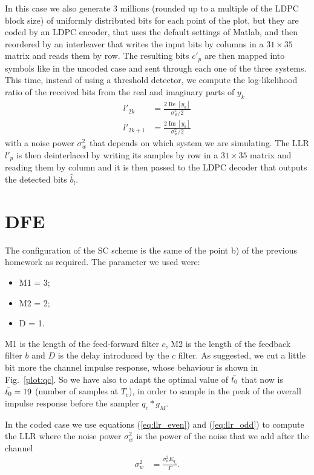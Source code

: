 \documentclass[a4paper,oneside]{article}
\renewcommand{\Re}[1]{\operatorname{Re}\left[#1\right]}
\renewcommand{\Im}[1]{\operatorname{Im}\left[#1\right]}
\begin{document}
In this case we also generate 3 millions (rounded up to a multiple of
the LDPC block size) of uniformly distributed bits for each point of
the plot, but they are coded by an LDPC encoder, that uses the default
settings of Matlab, and then reordered by an interleaver that writes
the input bits by columns in a $31\times35$ matrix and reads them by
row. The resulting bits $c'_p$ are then mapped into symbols like in
the uncoded case and sent through each one of the three systems.  This
time, instead of using a threshold detector, we compute the
log-likelihood ratio of the received bits from the real and imaginary
parts of $y_k$
\begin{align}
  l'_{2k} &= \frac{2\Re{y_k}}{\sigma^2_w/2}
  \label{eq:llr_even} \\
  l'_{2k+1} &= \frac{2\Im{y_k}}{\sigma^2_w/2}
  \label{eq:llr_odd}
\end{align}
with a noise power $\sigma^2_w$ that depends on which system we are
simulating. The LLR $l'_p$ is then deinterlaced by writing its samples
by row in a $31\times35$ matrix and reading them by column and it is
then passed to the LDPC decoder that outputs the detected bits
$\hat{b}_l$.

\section{DFE}
\label{sec:dfe}
The configuration of the SC scheme is the same of the point b) of the previous homework as required. The parameter we used were:
\begin{itemize}
\item M1 = 3;
\item  M2 = 2;
\item D = 1.
\end{itemize}
M1 is the length of the feed-forward filter $c$, M2 is the length of the feedback filter $b$ and $D$ is the delay introduced by the $c$ filter.
As suggested, we cut a little bit more the channel impulse response, whose behaviour is shown in Fig.~\ref{plot:qc}. So we have also to adapt the optimal value of $\Bar{t_0}$ that now is $\Bar{t_0} = 19$ (number of samples at $T_c$), in order to sample in the peak of the overall impulse response before the sampler $q_c * g_M$.

In the coded case we use equations (\ref{eq:llr_even}) and
(\ref{eq:llr_odd}) to compute the LLR where the noise power
$\sigma^2_w$ is the power of the noise that we add after the channel
\begin{align}
  \sigma^2_w &= \frac{\sigma^2_a E_{q_c}}{\Gamma} .
\end{align}
\end{document}
